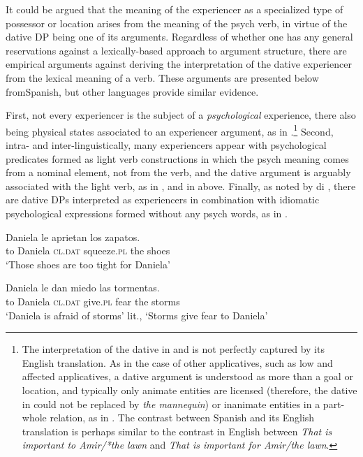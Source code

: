 \documentclass[output=paper,colorlinks,citecolor=brown,nonflat]{./langscibook}
\begin{document}
It could be argued that the meaning of the experiencer as a specialized type of possessor or location arises from the meaning of the psych verb, in virtue of the dative DP being one of its arguments. Regardless of whether one has any general reservations against a lexically-based approach to argument structure, there are empirical arguments against deriving the interpretation of the dative experiencer from the lexical meaning of a verb. These arguments are presented below fromSpanish, but other languages provide similar evidence. 

First, not every experiencer is the subject of a \textit{psychological} experience, there also being physical states associated to an experiencer argument, as in .\footnote{The interpretation of the dative in  and  is not perfectly captured by its English translation. As in the case of other applicatives, such as low and affected applicatives, a dative argument is understood as more than a goal or location, and typically only animate entities are licensed (therefore, the dative in  could not be replaced by \textit{the mannequin}) or inanimate entities in a part-whole relation, as in . The contrast between Spanish  and its English translation is perhaps similar to the contrast in English between \textit{That is important to Amir/*the lawn} and \textit{That is important for Amir/the lawn}.} Second, intra- and inter-linguistically, many experiencers appear with psychological predicates formed as light verb constructions in which the psych meaning comes from a nominal element, not from the verb, and the dative argument is arguably associated with the light verb, as in , and in  above. Finally, as noted by di \citet{DiTullio2015}, there are dative DPs interpreted as experiencers in combination with idiomatic psychological expressions formed without any psych words, as in . 

\ea%
    \label{ex:cuervo:16}
     {Daniela} {le}   {aprietan}  {los} {zapatos}.\\
    {to} Daniela  \textsc{cl.dat} squeeze.\textsc{pl}   the shoes\\
    \glt ‘Those shoes are too tight for Daniela’
    \z

\ea%
    \label{ex:cuervo:17}
     {Daniela} {le}   {dan}   {miedo}  {las} {tormentas}.\\
    {to} Daniela  \textsc{cl.dat} give.\textsc{pl}  fear  the storms\\
    \glt ‘Daniela is afraid of storms’ lit., ‘Storms give fear to Daniela’
    \z
\end{document}

